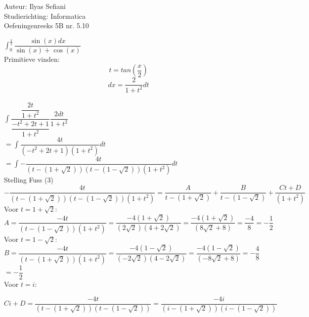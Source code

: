 \documentclass[a4paper]{article}
\newcommand{\dint}{\displaystyle\int}
\begin{document}
\noindent \large Auteur: Ilyas Sefiani \\
\noindent \large Studierichting: Informatica\\
\noindent \large Oefeningenreeks 5B nr. 5.10\\

\medskip

\normalsize

$\dint_{0}^{\tfrac{\pi}{2}} \dfrac{\sin(x)dx}{\sin(x)+\cos(x)}$\\

Primitieve vinden:\\

$$t = tan\left(\dfrac{x}{2}\right)$$ $$dx = \dfrac{2}{1+t^2}dt$$\\

$\displaystyle\int \dfrac{\dfrac{2t}{1+t^2}}{\dfrac{-t^2+2t+1}{1+t^2}}\dfrac{2dt}{1+t^2}$\\

$=\displaystyle\int \dfrac{4t}{(-t^2+2t+1)(1+t^2)}dt$\\

$=\displaystyle\int -\dfrac{4t}{(t-(1+\sqrt{2}))(t-(1-\sqrt{2}))(1+t^2)}dt$\\

Stelling Fuss (3)\\

$-\dfrac{4t}{(t-(1+\sqrt{2}))(t-(1-\sqrt{2}))(1+t^2)} = \dfrac{A}{t-(1+\sqrt{2})} + \dfrac{B}{t-(1-\sqrt{2})} + \dfrac{Ct+D}{(1+t^2)}$\\

Voor $t = 1+\sqrt{2}$:\\

$A = \dfrac{-4t}{(t-(1-\sqrt{2}))(1+t^2)} = \dfrac{-4(1+\sqrt{2})}{(2\sqrt{2})(4+2\sqrt{2})} = \dfrac{-4(1+\sqrt{2})}{(8\sqrt{2}+8)} = \dfrac{-4}{8} = -\dfrac{1}{2}$\\

Voor $t = 1-\sqrt{2}$:\\

$B = \dfrac{-4t}{(t-(1+\sqrt{2}))(1+t^2)}=\dfrac{-4(1-\sqrt{2})}{(-2\sqrt{2})(4-2\sqrt{2})}=\dfrac{-4(1-\sqrt{2})}{(-8\sqrt{2}+8)}=-\dfrac{4}{8}$\\

$= -\dfrac{1}{2}$\\

Voor $t=i$:\

$Ci+D = \dfrac{-4t}{(t-(1+\sqrt{2}))(t-(1-\sqrt{2}))}=\dfrac{-4i}{(i-(1+\sqrt{2}))(i-(1-\sqrt{2}))}$\\
\end{document}
